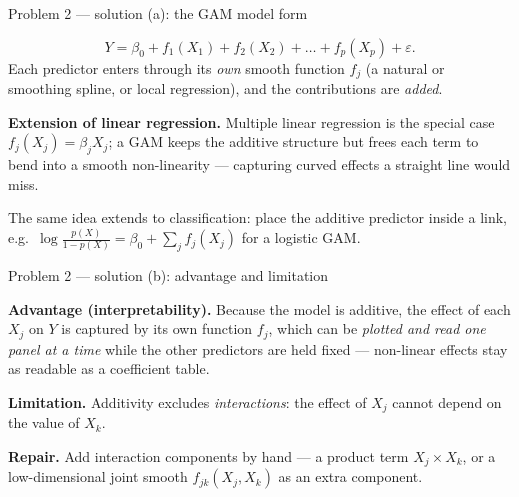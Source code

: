 \documentclass[aspectratio=169,11pt]{beamer}
\begin{document}
\begin{frame}{Problem 2 --- solution (a): the GAM model form}
  \begin{solutionbox}
    \[
      Y=\beta_0+f_1(X_1)+f_2(X_2)+\dots+f_p(X_p)+\varepsilon .
    \]
    Each predictor enters through its \emph{own} smooth function $f_j$ (a natural or smoothing
    spline, or local regression), and the contributions are \emph{added}.
    \medskip

    \textbf{Extension of linear regression.} Multiple linear regression is the special case
    $f_j(X_j)=\beta_jX_j$; a GAM keeps the additive structure but frees each term to bend into a
    smooth non-linearity --- capturing curved effects a straight line would miss.
  \end{solutionbox}
  \begin{takeaway}
    \footnotesize The same idea extends to classification: place the additive predictor inside a
    link, e.g.\ $\log\!\frac{p(X)}{1-p(X)}=\beta_0+\sum_j f_j(X_j)$ for a logistic GAM.
  \end{takeaway}
\end{frame}

\begin{frame}{Problem 2 --- solution (b): advantage and limitation}
  \begin{solutionbox}
    \textbf{Advantage (interpretability).} Because the model is additive, the effect of each
    $X_j$ on $Y$ is captured by its own function $f_j$, which can be \emph{plotted and read one
    panel at a time} while the other predictors are held fixed --- non-linear effects stay as
    readable as a coefficient table.
    \medskip

    \textbf{Limitation.} Additivity excludes \emph{interactions}: the effect of $X_j$ cannot
    depend on the value of $X_k$.
    \medskip

    \textbf{Repair.} Add interaction components by hand --- a product term $X_j\times X_k$, or a
    low-dimensional joint smooth $f_{jk}(X_j,X_k)$ as an extra component.
  \end{solutionbox}
\end{frame}
\end{document}
